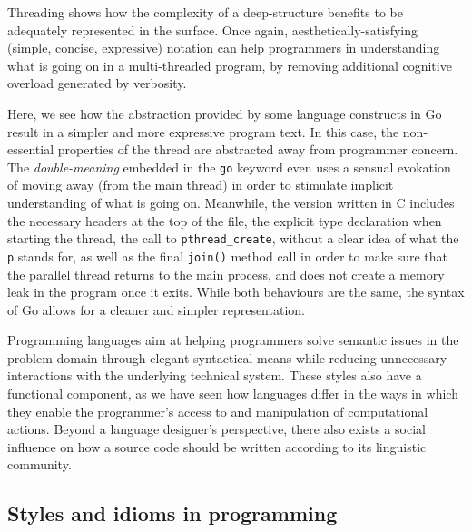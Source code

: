 Threading shows how the complexity of a deep-structure benefits to be adequately represented in the surface. Once again, aesthetically-satisfying (simple, concise, expressive) notation can help programmers in understanding what is going on in a multi-threaded program, by removing additional cognitive overload generated by verbosity.

Here, we see how the abstraction provided by some language constructs in Go result in a simpler and more expressive program text. In this case, the non-essential properties of the thread are abstracted away from programmer concern. The \emph{double-meaning} embedded in the \lstinline{go} keyword even uses a sensual evokation of moving away (from the main thread) in order to stimulate implicit understanding of what is going on. Meanwhile, the version written in C includes the necessary headers at the top of the file, the explicit type declaration when starting the thread, the call to \lstinline{pthread_create}, without a clear idea of what the \lstinline{p} stands for,  as well as the final \lstinline{join()} method call in order to make sure that the parallel thread returns to the main process, and does not create a memory leak in the program once it exits. While both behaviours are the same, the syntax of Go allows for a cleaner and simpler representation.

Programming languages aim at helping programmers solve semantic issues in the problem domain through elegant syntactical means while reducing unnecessary interactions with the underlying technical system. These styles also have a functional component, as we have seen how languages differ in the ways in which they enable the programmer's access to and manipulation of computational actions. Beyond a language designer's perspective, there also exists a social influence on how a source code should be written according to its linguistic community.

\subsection{Styles and idioms in programming}
\label{subsec:style-idioms-programming}

